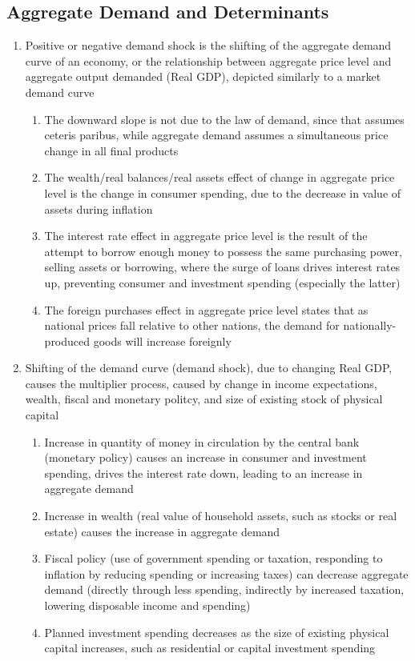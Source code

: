 \subsection{Aggregate Demand and Determinants}
\begin{enumerate}
\item Positive or negative demand shock is the shifting of the aggregate demand curve of an economy, or the relationship between aggregate price level and aggregate output demanded (Real GDP), depicted similarly to a market demand curve
\begin{enumerate}
\item The downward slope is not due to the law of demand, since that assumes ceteris paribus, while aggregate demand assumes a simultaneous price change in all final products
\item The wealth/real balances/real assets effect of change in aggregate price level is the change in consumer spending, due to the decrease in value of assets during inflation
\item The interest rate effect in aggregate price level is the result of the attempt to borrow enough money to possess the same purchasing power, selling assets or borrowing, where the surge of loans drives interest rates up, preventing consumer and investment spending (especially the latter)
\item The foreign purchases effect in aggregate price level states that as national prices fall relative to other nations, the demand for nationally-produced goods will increase foreignly
\end{enumerate}
\item Shifting of the demand curve (demand shock), due to changing Real GDP, causes the multiplier process, caused by change in income expectations, wealth, fiscal and monetary politcy, and size of existing stock of physical capital
\begin{enumerate}
\item Increase in quantity of money in circulation by the central bank (monetary policy) causes an increase in consumer and investment spending, drives the interest rate down, leading to an increase in aggregate demand
\item Increase in wealth (real value of household assets, such as stocks or real estate) causes the increase in aggregate demand
\item Fiscal policy (use of government spending or taxation, responding to inflation by reducing spending or increasing taxes) can decrease aggregate demand (directly through less spending, indirectly by increased taxation, lowering disposable income and spending)
\item Planned investment spending decreases as the size of existing physical capital increases, such as residential or capital investment spending
\end{enumerate}
\end{enumerate}


